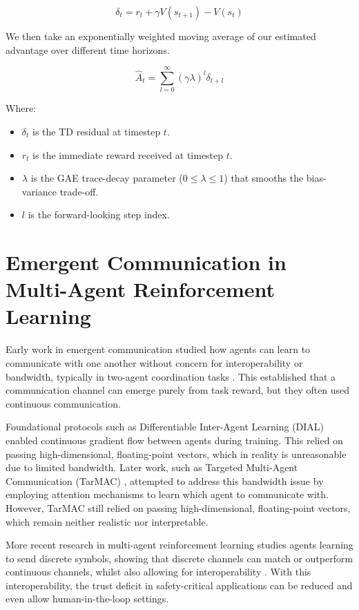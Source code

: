 \begin{equation}
\delta_t = r_t + \gamma V(s_{t+1}) - V(s_t)
\end{equation}

We then take an exponentially weighted moving average of our estimated advantage over different time horizons.

\begin{equation}
\hat{A}_t = \sum_{l=0}^{\infty} (\gamma \lambda)^l \delta_{t+l}
\end{equation}

Where:
\begin{itemize}[noitemsep, topsep=0pt]
\item $\delta_t$ is the TD residual at timestep $t$.
\item $r_t$ is the immediate reward received at timestep $t$.
\item $\lambda$ is the GAE trace-decay parameter ($0 \leq \lambda \leq 1$) that smooths the bias-variance trade-off.
\item $l$ is the forward-looking step index.
\end{itemize}


\section{Emergent Communication in Multi-Agent Reinforcement Learning}
\label{sec:2.3}

Early work in emergent communication studied how agents can learn to communicate with one another without concern for interoperability or bandwidth, typically in two-agent coordination tasks \cite{dial-rial}.
This established that a communication channel can emerge purely from task reward, but they often used continuous communication.

Foundational protocols such as Differentiable Inter-Agent Learning (DIAL) \cite{dial-rial} enabled continuous gradient flow between agents during training.
This relied on passing high-dimensional, floating-point vectors, which in reality is unreasonable due to limited bandwidth.
Later work, such as Targeted Multi-Agent Communication (TarMAC) \cite{tarmac}, attempted to address this bandwidth issue by employing attention mechanisms to learn which agent to communicate with.
However, TarMAC still relied on passing high-dimensional, floating-point vectors, which remain neither realistic nor interpretable.

More recent research in multi-agent reinforcement learning studies agents learning to send discrete symbols, showing that discrete channels can match or outperform continuous channels, whilst also allowing for interoperability \cite{DiscreteComms}.
With this interoperability, the trust deficit in safety-critical applications can be reduced and even allow human-in-the-loop settings.

